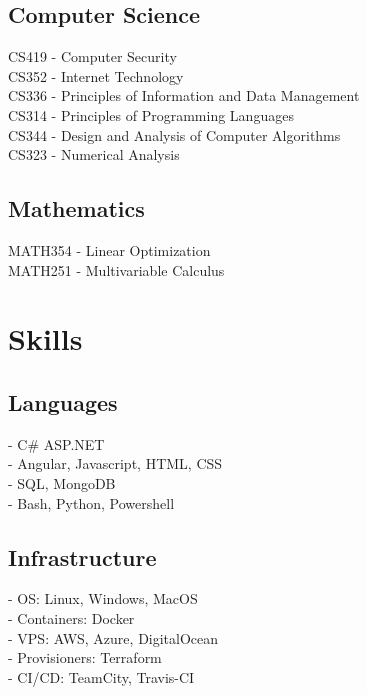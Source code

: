 \documentclass[]{Resume}
\begin{document}
\begin{minipage}[t]{0.33\textwidth}
\subsection{Computer Science}
CS419 - Computer Security \\
CS352 - Internet Technology \\
CS336 - Principles of Information and Data Management \\
CS314 - Principles of Programming Languages \\
CS344 - Design and Analysis of Computer Algorithms \\
CS323 - Numerical Analysis \\
\sectionsep
\subsection{Mathematics}
MATH354 - Linear Optimization \\
MATH251 - Multivariable Calculus


\section{Skills}
\subsection{Languages}
- C\# ASP.NET \\
- Angular, Javascript, HTML, CSS \\
- SQL, MongoDB \\
- Bash, Python, Powershell
\sectionsep

\subsection{Infrastructure}
- OS: Linux, Windows, MacOS \\
- Containers: Docker \\
- VPS: AWS, Azure, DigitalOcean \\
- Provisioners: Terraform \\
- CI/CD: TeamCity, Travis-CI \\
\sectionsep


%
%

\end{minipage} 
\end{document}
